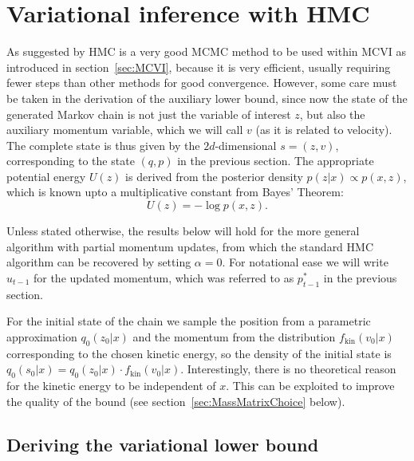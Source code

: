 \section{Variational inference with HMC}
\label{sec:HMCVI}
As suggested by \textcite{Salimans2014} HMC is a very good MCMC method to be used within MCVI as introduced in section~\ref{sec:MCVI}, because it is very efficient, usually requiring fewer steps than other methods for good convergence. However, some care must be taken in the derivation of the auxiliary lower bound, since now the state of the generated Markov chain is not just the variable of interest $z$, but also the auxiliary momentum variable, which we will call $v$ (as it is related to velocity). The complete state is thus given by the $2d$-dimensional $s=(z, v)$, corresponding to the state $(q, p)$ in the previous section. The appropriate potential energy $U(z)$ is derived from the posterior density $p(z|x) \propto p(x, z)$, which is known upto a multiplicative constant from Bayes' Theorem:
\begin{equation} \label{eq:VIwithHMCPotEnergy}
U(z) = -\log p(x, z).
\end{equation}

Unless stated otherwise, the results below will hold for the more general algorithm with partial momentum updates, from which the standard HMC algorithm can be recovered by setting $\alpha = 0$. For notational ease we will write $u_{t-1}$ for the updated momentum, which was referred to as $p^*_{t-1}$ in the previous section. 

For the initial state of the chain we sample the position from a parametric approximation $q_0(z_0|x)$ and the momentum from the distribution $f_\textrm{kin}(v_0|x)$ corresponding to the chosen kinetic energy, so the density of the initial state is $q_0(s_0|x)=q_0(z_0|x) \cdot f_\textrm{kin}(v_0|x)$. Interestingly, there is no theoretical reason for the kinetic energy to be independent of $x$. This can be exploited to improve the quality of the bound (see section~\ref{sec:MassMatrixChoice} below). \label{sec:KinEnergyMayDependOnX}

\subsection{Deriving the variational lower bound}

